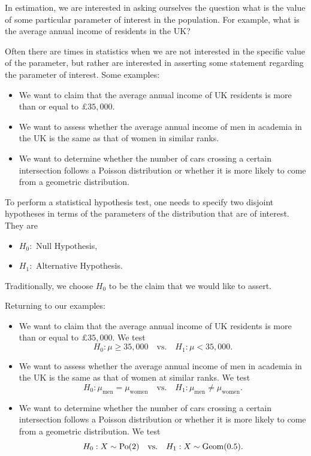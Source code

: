 \documentclass[
]{book}
\providecommand{\tightlist}{%
  \setlength{\itemsep}{0pt}\setlength{\parskip}{0pt}}
\begin{document}
In estimation, we are interested in asking ourselves the question what is the value of some particular parameter of interest in the population. For example, what is the average annual income of residents in the UK?

Often there are times in statistics when we are not interested in the specific value of the parameter, but rather are interested in asserting some statement regarding the parameter of interest. Some examples:

\begin{itemize}
\tightlist
\item
  We want to claim that the average annual income of UK residents is more than or equal to \(£35,000\).\\
\item
  We want to assess whether the average annual income of men in academia in the UK is the same as that of women in similar ranks.\\
\item
  We want to determine whether the number of cars crossing a certain intersection follows a Poisson distribution or whether it is more likely to come from a geometric distribution.
\end{itemize}

To perform a statistical hypothesis test, one needs to specify two disjoint hypotheses in terms of the parameters of the distribution that are of interest. They are

\begin{itemize}
\tightlist
\item
  \(H_0:\) Null Hypothesis,\\
\item
  \(H_1:\) Alternative Hypothesis.
\end{itemize}

Traditionally, we choose \(H_0\) to be the claim that we would like to assert.

Returning to our examples:

\begin{itemize}
\tightlist
\item
  We want to claim that the average annual income of UK residents is more than or equal to \(£35,000\). We test\\

  \[ H_0: \mu \geq 35,000 \quad \text{vs.} \quad H_1: \mu < 35,000. \]
\item
  We want to assess whether the average annual income of men in academia in the UK is the same as that of women at similar ranks. We test\\

  \[ H_0: \mu_{\text{men}} = \mu_{\text{women}} \quad \text{vs.} \quad H_1: \mu_{\text{men}} \neq \mu_{\text{women}}.\]
\item
  We want to determine whether the number of cars crossing a certain intersection follows a Poisson distribution or whether it is more likely to come from a geometric distribution. We test\\

  \[ H_0: X \sim {\rm Po} (2) \quad \text{vs.} \quad H_1: X \sim {\rm Geom} (0.5).\]
\end{itemize}
\end{document}
